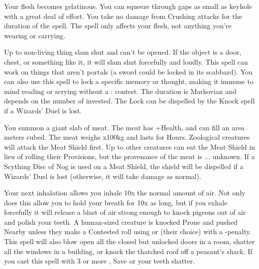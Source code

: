 {\SPELL[
  Name=Lipby Chonk's Viscous Form,
  Link=wizardry-lipby-chonks-viscous-form,
  Paradigm=Biomancy,
  Save=N,
  Duration=Combat or \SUMDICE Minutes,
  Counter=n/a ,
  Keywords=None,
  Target=Self
]



Your flesh becomes gelatinous. You can squeeze through gaps as small as
keyhole with a great deal of effort. You take no damage from Crushing
attacks for the duration of the spell. The spell only affects your flesh,
not anything you're wearing or carrying.




\SPELL[
  Name=Lock,
  Link=wizardry-lock,
  Paradigm=Mind,
  Save=Y (negate),
  Duration=Markovian,
  Counter=n/a ,
  Keywords=None,
  Target=Close and Nearby Objects
]



Up to \DICE non-living thing slam shut and can't be opened. If the object is
a door, chest, or something like it, it will slam shut forcefully and
loudly. This spell can work on things that aren't portals (a sword could be
locked in its scabbard). You can also use this spell to lock a specific
memory or thought, making it immune to mind reading or scrying without a \RB
: \INT contest.  The duration is Markovian and depends on the number of
\DICE invested.  The Lock can be dispelled by the Knock spell if a Wizards'
Duel is lost.


\SPELL[
  Name=Meat Shield,
  Link=wizardry-meat-shield,
  Paradigm=Biomancy,
  Save=N,
  Duration=Combat or \SUMDICE Minutes ,
  Counter=n/a ,
  Keywords=None,
  Target=Close and Nearby
]

You summon a giant slab of meat.  The meat has \SUMDICE+\DICE Health, and
can fill an area \DICE meters cubed.  The meat weighs \DICE x100kg and lasts
for \DICE Hours.  Zoological creatures will attack the Meat Shield first. 
Up to \DICE other creatures can eat the Meat Shield in lieu of rolling their
Provisions, but the provenance of the meat is ... unknown.  If a Scything
Disc of Nog is used on a Meat Shield, the shield will be dispelled if a
Wizards' Duel is lost (otherwise, it will take damage as normal).





\SPELL[
  Name=Mighty Lungs,
  Link=wizardry-mighty-lungs,
  Paradigm=Biomancy,
  Save=N,
  Duration=Until exhalation,
  Counter=n/a ,
  Keywords=Contested,
  Target=Self
]

Your next inhalation allows you inhale 10x the normal amount of air. Not
only does this allow you to hold your breath for 10x as long, but if you
exhale forcefully it will release a blast of air strong enough to knock
pigeons out of air and polish your teeth. A human-sized creature is knocked
Prone and pushed Nearby unless they make a Contested roll using \DEX or \VIG
(their choice) with a -\DICE penalty.  This spell will also blow open all
the closed but unlocked doors in a room, shatter all the windows in a
building, or knock the thatched roof off a peasant's shack. If you cast this
spell with 3 or more \DICE, Save or your teeth shatter.




}
